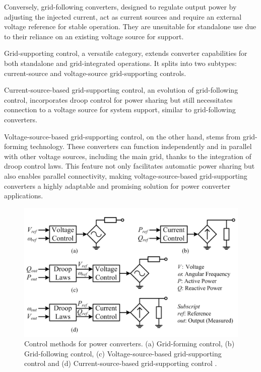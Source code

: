 Conversely, grid-following converters, designed to regulate output power by
adjusting the injected current, act as current sources and require an external
voltage reference for stable operation. They are unsuitable for standalone use
due to their reliance on an existing voltage source for support.

Grid-supporting control, a versatile category, extends converter capabilities
for both standalone and grid-integrated operations. It splits into two subtypes:
current-source and voltage-source grid-supporting controls.

Current-source-based grid-supporting control, an evolution of grid-following
control, incorporates droop control for power sharing but still necessitates
connection to a voltage source for system support, similar to grid-following
converters.

Voltage-source-based grid-supporting control, on the other hand, stems from
grid-forming technology. These converters can function independently and in
parallel with other voltage sources, including the main grid, thanks to the
integration of droop control laws. This feature not only facilitates automatic
power sharing but also enables parallel connectivity, making
voltage-source-based grid-supporting converters a highly adaptable and promising
solution for power converter applications.

\begin{figure}[h!]
    \centering
    \includegraphics[width=12cm]{images/control_methods.png}
    \caption{Control methods for power converters. (a) Grid-forming control, (b)
    Grid-following control, (c) Voltage-source-based grid-supporting control and
    (d) Current-source-based grid-supporting control \cite{paquette2015virtual}.}
    \label{fig:control_methods}
\end{figure}


